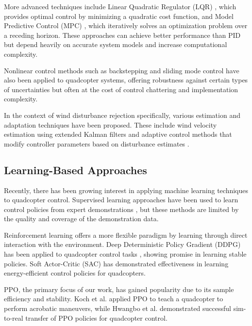 \documentclass[12pt]{article}
\begin{document}
More advanced techniques include Linear Quadratic Regulator (LQR) \cite{chitsaz2011lqr}, which provides optimal control by minimizing a quadratic cost function, and Model Predictive Control (MPC) \cite{alexis2011mpc}, which iteratively solves an optimization problem over a receding horizon. These approaches can achieve better performance than PID but depend heavily on accurate system models and increase computational complexity.

Nonlinear control methods such as backstepping \cite{madani2006backstepping} and sliding mode control \cite{xu2006slidingmode} have also been applied to quadcopter systems, offering robustness against certain types of uncertainties but often at the cost of control chattering and implementation complexity.

In the context of wind disturbance rejection specifically, various estimation and adaptation techniques have been proposed. These include wind velocity estimation using extended Kalman filters \cite{balas2018disturbance} and adaptive control methods that modify controller parameters based on disturbance estimates \cite{wang2016adaptive}.

\subsection{Learning-Based Approaches}

Recently, there has been growing interest in applying machine learning techniques to quadcopter control. Supervised learning approaches have been used to learn control policies from expert demonstrations \cite{zhang2016learning}, but these methods are limited by the quality and coverage of the demonstration data.

Reinforcement learning offers a more flexible paradigm by learning through direct interaction with the environment. Deep Deterministic Policy Gradient (DDPG) has been applied to quadcopter control tasks \cite{hwangbo2017ddpg}, showing promise in learning stable policies. Soft Actor-Critic (SAC) \cite{ha2020sac} has demonstrated effectiveness in learning energy-efficient control policies for quadcopters.

PPO, the primary focus of our work, has gained popularity due to its sample efficiency and stability. Koch et al. \cite{koch2019ppo} applied PPO to teach a quadcopter to perform acrobatic maneuvers, while Hwangbo et al. \cite{hwangbo2019learning} demonstrated successful sim-to-real transfer of PPO policies for quadcopter control.
\end{document}
